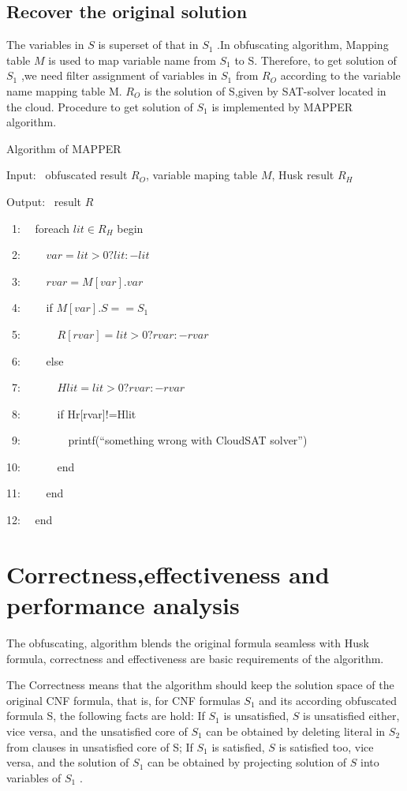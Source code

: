 \documentclass[runningheads,a4paper]{llncs}
\begin{document}
\subsection{Recover the original solution}

The variables in $S$ is superset of that in $S_1$ .In obfuscating algorithm, Mapping table $M$ is used to map variable name from $S_1$  to S. Therefore, to get solution of $S_1$  ,we need filter assignment of variables in $S_1$  from  $R_O$  according to the variable name mapping table M.  $R_O$  is the solution of S,given by SAT-solver located in the cloud. Procedure to get solution of $S_1$  is implemented by MAPPER algorithm.

\noindent Algorithm of MAPPER

Input:~ obfuscated result $R_O$, variable maping table $M$, Husk result $R_H$

Output:~ result $R$

~1:~~ foreach $lit \in R_H$ begin

~2:~~~~   $var=lit>0?lit:-lit$

~3:~~~~   $rvar=M[var].var$

~4:~~~~   if $M[var].S==S_1$

~5:~~~~~~       $R[rvar]=lit>0?rvar:-rvar$ 

~6:~~~~   else    

~7:~~~~~~       $Hlit=lit>0?rvar:-rvar$

~8:~~~~~~       if Hr[rvar]!=Hlit

~9:~~~~~~~~       printf(“something wrong with CloudSAT solver”)

10:~~~~~~       end

11:~~~~   end

12:~~  end

\section{Correctness,effectiveness and performance analysis}

The obfuscating, algorithm blends the original formula seamless with Husk formula, correctness and effectiveness are basic requirements of the algorithm. 

The Correctness means that the algorithm should keep the solution space of the original CNF formula, that is, for CNF formulas $S_1$  and its according obfuscated formula S, 
the following facts are hold: If $S_1$  is unsatisfied, $S$ is unsatisfied either, vice versa, and the unsatisfied core of $S_1$  can be obtained by deleting literal in $S_2$  from clauses in unsatisfied core of S;
If $S_1$  is satisfied, $S$ is satisfied too, vice versa, and the solution of $S_1$  can be obtained by projecting solution of $S$ into variables of $S_1$ . 
\end{document}
